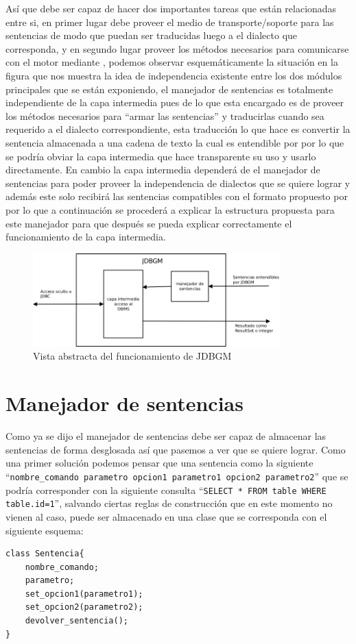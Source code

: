 Así que \jj debe ser capaz de hacer dos importantes tareas que están relacionadas entre si, en primer lugar debe proveer el medio de transporte/soporte para las sentencias de modo que puedan ser traducidas luego a el dialecto que corresponda, y en segundo lugar proveer los métodos necesarios para comunicarse con el motor mediante \jd, podemos observar esquemáticamente la situación en la figura  que nos muestra la idea de independencia existente entre los dos módulos principales que se están exponiendo, el manejador de sentencias es totalmente independiente de la capa intermedia pues de lo que esta encargado es de proveer los métodos necesarios para ``armar las sentencias'' y traducirlas cuando sea requerido a el dialecto correspondiente, esta traducción lo que hace es convertir la sentencia almacenada a una cadena de texto la cual es entendible por \jd por lo que se podría obviar la capa intermedia que hace transparente su uso y usarlo directamente. En cambio la capa intermedia dependerá de el manejador de sentencias para poder proveer la independencia de dialectos que se quiere lograr y además este solo recibirá las sentencias compatibles con el formato propuesto por \jj por lo que a continuación se procederá a explicar la estructura propuesta para este manejador para que después se pueda explicar correctamente el funcionamiento de la capa intermedia.
%
\begin{figure}
  \centering
    \includegraphics[width=0.85\textwidth]{figuras/jdbgm-closerlook.png}
  \caption{Vista abstracta del funcionamiento de JDBGM}
  \label{fig:jdbgm:closerlook}
\end{figure}

\section{Manejador de sentencias}
Como ya se dijo el manejador de sentencias debe ser capaz de almacenar las sentencias de forma desglosada así que pasemos a ver que se quiere lograr. Como una primer solución podemos pensar que una sentencia como la siguiente ``\verb=nombre_comando parametro opcion1 parametro1 opcion2 parametro2='' que se podría corresponder con la siguiente consulta ``\verb|SELECT * FROM table WHERE table.id=1|'', salvando ciertas reglas de construcción que en este momento no vienen al caso, puede ser almacenado en una clase que se corresponda con el siguiente esquema:
%
\begin{lstlisting}[title=Pseudocódigo de la estructura de dato que contiene la sentencia]
class Sentencia{
	nombre_comando;
	parametro;
	set_opcion1(parametro1);
	set_opcion2(parametro2);
	devolver_sentencia();
}
\end{lstlisting}

